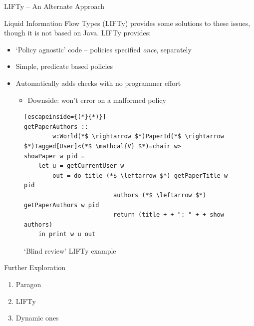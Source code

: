 \begin{frame}[fragile]{LIFTy -- An Alternate Approach}
	
	Liquid Information Flow Types (LIFTy) provides some solutions to these issues, though it is not based on Java. LIFTy provides:
	
	\begin{itemize}
		\item `Policy agnostic' code -- policies specified \textit{once}, separately
		\item Simple, predicate based policies
		\item Automatically adds checks with no programmer effort
		\begin{itemize}
			\item Downside: won't error on a malformed policy
		\end{itemize}
	\end{itemize}
	
	\begin{figure}
		\begin{lstlisting}[escapeinside={(*}{*)}]
getPaperAuthors :: 
		w:World(*$ \rightarrow $*)PaperId(*$ \rightarrow $*)Tagged[User]<(*$ \mathcal{V} $*)=chair w>
showPaper w pid =
	let u = getCurrentUser w
		out = do title (*$ \leftarrow $*) getPaperTitle w pid
						 authors (*$ \leftarrow $*) getPaperAuthors w pid
						 return (title + + ": " + + show authors)
	in print w u out

		\end{lstlisting}
		\caption{`Blind review' LIFTy example \cite{work:lifty}}
	\end{figure}
	
	
\end{frame}

\begin{frame}{Further Exploration}
	\begin{enumerate}
		\item Paragon
		\item LIFTy
		\item Dynamic ones
	\end{enumerate}
\end{frame}

